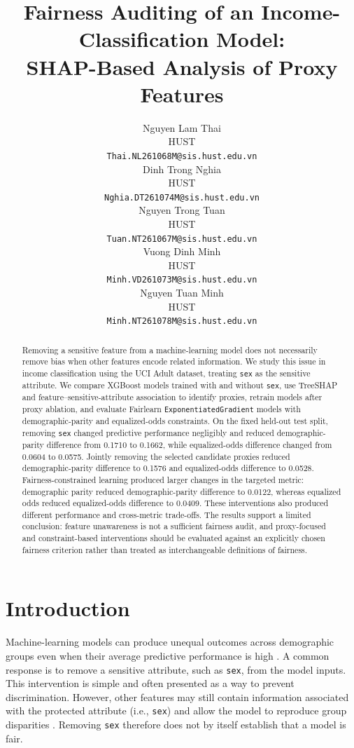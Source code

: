 \documentclass{article}
\title{Fairness Auditing of an Income-Classification Model:\\
SHAP-Based Analysis of Proxy Features}
\author{%
  Nguyen Lam Thai \\
  HUST \\
  \texttt{Thai.NL261068M@sis.hust.edu.vn} \\
  \And
  Dinh Trong Nghia \\
  HUST \\
  \texttt{Nghia.DT261074M@sis.hust.edu.vn} \\
  \And
  Nguyen Trong Tuan \\
  HUST \\
  \texttt{Tuan.NT261067M@sis.hust.edu.vn} \\
  \And
  Vuong Dinh Minh \\
  HUST \\
  \texttt{Minh.VD261073M@sis.hust.edu.vn} \\
  \And
  Nguyen Tuan Minh \\
  HUST \\
  \texttt{Minh.NT261078M@sis.hust.edu.vn} \\
}
\begin{document}
\maketitle


\begin{abstract}
  Removing a sensitive feature from a machine-learning model does not
  necessarily remove bias when other features encode related
  information. We study this issue in income classification using the UCI
  Adult dataset, treating \texttt{sex} as the sensitive attribute. We compare
  XGBoost models trained with and without \texttt{sex}, use TreeSHAP and
  feature--sensitive-attribute association to identify proxies, retrain
  models after proxy ablation, and evaluate Fairlearn
  \texttt{ExponentiatedGradient} models with demographic-parity and
  equalized-odds constraints. On the fixed held-out test split, removing
  \texttt{sex} changed predictive performance negligibly and reduced
  demographic-parity difference from 0.1710 to 0.1662, while equalized-odds
  difference changed from 0.0604 to 0.0575. Jointly removing the selected
  candidate proxies reduced demographic-parity difference to 0.1576 and
  equalized-odds difference to 0.0528. 
  Fairness-constrained learning produced larger changes in
  the targeted metric: demographic parity reduced demographic-parity
  difference to 0.0122, whereas equalized odds reduced equalized-odds
  difference to 0.0409. These interventions also produced different
  performance and cross-metric trade-offs. The results support a limited
  conclusion: feature unawareness is not a sufficient fairness audit, and
  proxy-focused and constraint-based interventions should be evaluated
  against an explicitly chosen fairness criterion rather than treated as
  interchangeable definitions of fairness.
\end{abstract}

\section{Introduction}\label{sec:introduction}

Machine-learning models can produce unequal outcomes across demographic groups
even when their average predictive performance is high
\citep{mehrabi2021survey}. A common response is to remove a sensitive
attribute, such as \texttt{sex}, from the model inputs. This intervention is
simple and often presented as a way to prevent discrimination. However, other
features may still contain information associated with the protected attribute
(i.e., \texttt{sex}) and allow the model to reproduce group disparities
\citep{datta2017proxy}. Removing \texttt{sex} therefore does not by itself
establish that a model is fair.
\end{document}
